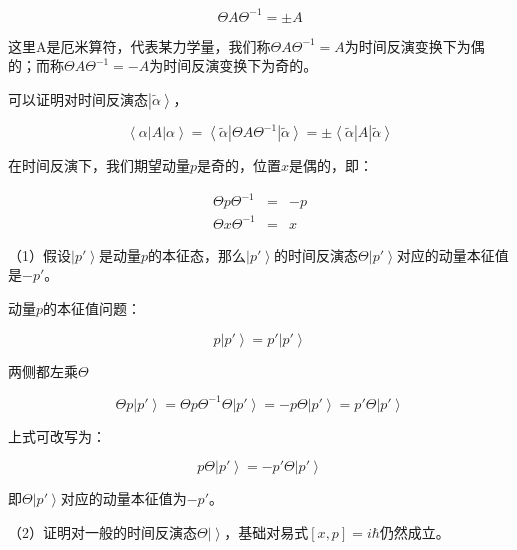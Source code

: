 \begin{equation}
\Theta A \Theta^{-1} = \pm A
\end{equation}

这里A是厄米算符，代表某力学量，我们称$\Theta A \Theta^{-1} = A$为时间反演变换下为偶的；而称$\Theta A \Theta^{-1} = - A$为时间反演变换下为奇的。

可以证明对时间反演态$\left| \tilde{\alpha}  \right\rangle$，

\begin{equation}
\left\langle \alpha \right| A \left| \alpha \right\rangle = \left\langle \tilde{\alpha} \right| \Theta A \Theta^{-1} \left| \tilde{\alpha} \right\rangle = \pm \left\langle \tilde{\alpha} \right| A \left| \tilde{\alpha} \right\rangle
\end{equation}

在时间反演下，我们期望动量$p$是奇的，位置$x$是偶的，即：

\begin{eqnarray}
\Theta p \Theta^{-1} & = & - p \\
\Theta x \Theta^{-1} & = & x
\end{eqnarray}

（1）假设$\left| p' \right\rangle$是动量$p$的本征态，那么$\left| p' \right\rangle$的时间反演态$\Theta \left| p' \right\rangle$对应的动量本征值是$- p'$。

动量$p$的本征值问题：

\begin{equation}
p \left| p' \right\rangle = p' \left| p' \right\rangle
\end{equation}

两侧都左乘$\Theta$

\begin{equation}
\Theta p \left| p' \right\rangle = \Theta p \Theta^{-1} \Theta \left| p' \right\rangle = - p \Theta \left| p' \right\rangle = p' \Theta \left| p' \right\rangle
\end{equation}

上式可改写为：

\begin{equation}
p \Theta \left| p' \right\rangle = - p' \Theta \left| p' \right\rangle
\end{equation}

即$\Theta \left| p' \right\rangle$对应的动量本征值为$-p'$。

（2）证明对一般的时间反演态$\Theta \left| {} \right\rangle$，基础对易式$[x, p] = i \hbar$仍然成立。

